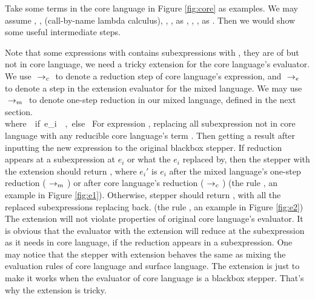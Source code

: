 Take some terms in the core language in Figure \ref{fig:core} as examples.
We may assume , ,  (call-by-name lambda calculus), , ,  as , , \m{$\lambda$},  as . Then we would show some useful intermediate steps.

Note that some expressions with  contains subexpressions with , they are of  but not in core language, we need a tricky extension for the core language's evaluator.
We use $~\rightarrow_c~$ to denote a reduction step of core language's expression, and $~\rightarrow_e~$ to denote a step in the extension evaluator for the mixed language. We may use $~\rightarrow_m~$ to denote one-step reduction in our mixed language, defined in the next section.
{}
{\\where~~if~e_i~\in~,~else~}
{}
For expression , replacing all subexpression not in core language with any reducible core language's term . Then getting a result after inputting the new expression  to the original blackbox stepper. If reduction appears at a subexpression at $e_i$ or what the $e_i$ replaced by, then the stepper with the extension should return , where $e_i'$ is $e_i$ after the mixed language's one-step reduction ($~\rightarrow_m~$) or after core language's reduction ($~\rightarrow_c~$) (the rule , an example in Figure \ref{fig:e1}). Otherwise, stepper should return , with all the replaced subexpressions replacing back. (the rule , an example in Figure \ref{fig:e2}) The extension will not violate properties of original core language's evaluator. It is obvious that the evaluator with the extension will reduce at the subexpression as it needs in core language, if the reduction appears in a subexpression. One may notice that the stepper with extension behaves the same as mixing the evaluation rules of core language and surface language. The extension is just to make it works when the evaluator of core language is a blackbox stepper. That's why the extension is tricky.

